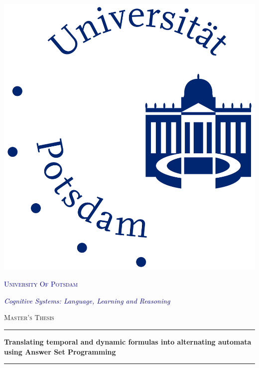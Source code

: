 \begin{titlepage}
    \begin{center}
    
    \begin{center}
      \includegraphics[scale=0.2]{uni-potsdam.jpg}
    \end{center}
    \vspace*{.008\textheight}
    {\scshape\LARGE \textcolor{darkblue}{University Of Potsdam}\par}
    
    \large 
    \textcolor{darkblue}{\emph{Cognitive Systems: Language, Learning and Reasoning}}
    
    \vspace{1.5cm}
    \textsc{\Large Master's Thesis}\\[0.5cm]
    
    \noindent\rule{\textwidth}{0.3mm}
    {\huge \bfseries Translating temporal and dynamic formulas into alternating automata using Answer Set Programming\par}\vspace{0.4cm}
    \noindent\rule{\textwidth}{0.3mm}
     

\end{center}
\end{titlepage}
